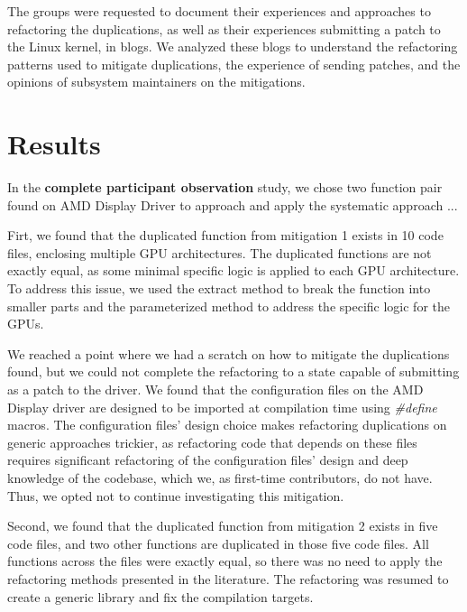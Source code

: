 \documentclass[10pt,conference]{IEEEtran}
\begin{document}
The groups were requested to document their experiences and approaches to refactoring the duplications, as well as their experiences submitting a patch to the Linux kernel, in blogs. We analyzed these blogs to understand the refactoring patterns used to mitigate duplications, the experience of sending patches, and the opinions of subsystem maintainers on the mitigations.

\section{Results}

In the \textbf{complete participant observation} study, we chose two function pair found on AMD Display Driver to approach and apply the systematic approach ...


Firt, we found that the duplicated function from mitigation 1
exists in 10 code files, enclosing multiple GPU architectures. The duplicated 
functions are not exactly equal, as some minimal specific logic is applied to each GPU architecture. To address this issue, we used the extract method to 
break the function into smaller parts and the parameterized method to address 
the specific logic for the GPUs.

We reached a point where we had a scratch on how to mitigate the duplications found, but we could not complete the refactoring to a state capable of submitting as a patch to the driver. We found that the configuration files on the AMD Display driver are designed to be imported at compilation time using \textit{\#define} macros. The configuration files' design choice makes refactoring duplications on generic approaches trickier, as refactoring code that depends on these files requires significant refactoring of the configuration files' design and deep knowledge of the codebase, which we, as first-time contributors, do not have. Thus, we opted not to continue investigating this mitigation.

Second, we found that the duplicated function from mitigation 2 exists in five code files, 
and two other functions are duplicated in those five code files. All functions across the files were exactly equal, 
so there was no need to apply the refactoring methods presented in the literature. 
The refactoring was resumed to create a generic library and fix the compilation targets.
\end{document}
